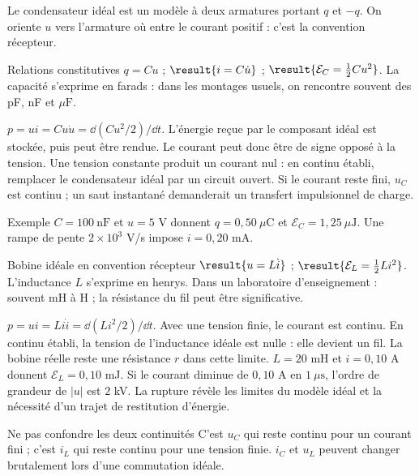 Le condensateur idéal est un modèle à deux armatures portant $q$ et $-q$. On oriente $u$ vers l’armature où entre le courant positif : c’est la convention récepteur.
\begin{loi}{Relations constitutives}
$q=Cu$ ; $\result{i=C\dot u}$ ; $\result{\mathcal E_C=\tfrac12Cu^2}$. La capacité s’exprime en farads : dans les montages usuels, on rencontre souvent des pF, nF et $\mu\mathrm{ F}$.
\end{loi}
$p=ui=Cu\dot u=\dd(Cu^2/2)/\dd t$. L’énergie reçue par le composant idéal est stockée, puis peut être rendue. Le courant peut donc être de signe opposé à la tension.
Une tension constante produit un courant nul : en continu établi, remplacer le condensateur idéal par un circuit ouvert. Si le courant reste fini, $u_C$ est continu ; un saut instantané demanderait un transfert impulsionnel de charge.
\begin{methode}{Exemple}
$C=100\ \mathrm{nF}$ et $u=5$ V donnent $q=0{,}50\ \mu\mathrm{ C}$ et $\mathcal E_C=1{,}25\ \mu\mathrm{ J}$. Une rampe de pente $2\times10^3$ V/s impose $i=0{,}20$ mA.
\end{methode}


\begin{loi}{Bobine idéale en convention récepteur}
$\result{u=L\dot i}$ ; $\result{\mathcal E_L=\tfrac12Li^2}$. L’inductance $L$ s’exprime en henrys. Dans un laboratoire d’enseignement : souvent mH à H ; la résistance du fil peut être significative.
\end{loi}
$p=ui=Li\dot i=\dd(Li^2/2)/\dd t$. Avec une tension finie, le courant est continu. En continu établi, la tension de l’inductance idéale est nulle : elle devient un fil. La bobine réelle reste une résistance $r$ dans cette limite.
$L=20$ mH et $i=0{,}10$ A donnent $\mathcal E_L=0{,}10$ mJ. Si le courant diminue de $0{,}10$ A en $1\ \mu\mathrm{ s}$, l’ordre de grandeur de $|u|$ est $2$ kV. La rupture révèle les limites du modèle idéal et la nécessité d’un trajet de restitution d’énergie.
\begin{piege}{Ne pas confondre les deux continuités}
C’est $u_C$ qui reste continu pour un courant fini ; c’est $i_L$ qui reste continu pour une tension finie. $i_C$ et $u_L$ peuvent changer brutalement lors d’une commutation idéale.
\end{piege}


